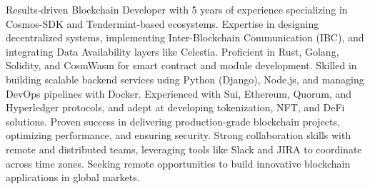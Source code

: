 

\begin{cvparagraph}
Results‑driven Blockchain Developer with 5 years of experience specializing in Cosmos-SDK and Tendermint-based ecosystems. Expertise in designing decentralized systems, implementing Inter-Blockchain Communication (IBC), and integrating Data Availability layers like Celestia. Proficient in Rust, Golang, Solidity, and CosmWasm for smart contract and module development. Skilled in building scalable backend services using Python (Django), Node.js, and managing DevOps pipelines with Docker. Experienced with Sui, Ethereum, Quorum, and Hyperledger protocols, and adept at developing tokenization, NFT, and DeFi solutions. Proven success in delivering production-grade blockchain projects, optimizing performance, and ensuring security. Strong collaboration skills with remote and distributed teams, leveraging tools like Slack and JIRA to coordinate across time zones. Seeking remote opportunities to build innovative blockchain applications in global markets.
\end{cvparagraph}
